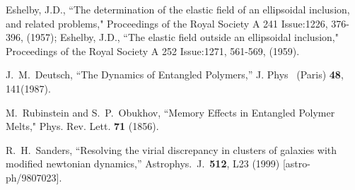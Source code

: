 \documentclass[a4paper,12pt]{article}
\begin{document}
\begin{thebibliography}{100}
  
  
  

  




  



  Eshelby, J.D., ``The determination of the elastic field of an ellipsoidal inclusion, and related problems," Proceedings of the Royal Society A 241 Issue:1226, 376-396, (1957); Eshelby, J.D., ``The elastic field outside an ellipsoidal inclusion," Proceedings of the Royal Society A 252 Issue:1271, 561-569, (1959).


J.~M.~Deutsch,
``The Dynamics of Entangled Polymers,'' 
J. Phys ~(Paris) {\bf 48}, 141(1987).

M.~Rubinstein and S.~P.~Obukhov,
``Memory Effects in Entangled Polymer Melts,"
Phys. Rev. Lett. {\bf 71} (1856).



  R.~H.~Sanders,
  ``Resolving the virial discrepancy in clusters of galaxies with modified newtonian dynamics,''
  Astrophys.\ J.\  {\bf 512}, L23 (1999)
  [astro-ph/9807023].




\end{thebibliography}
\end{document}
